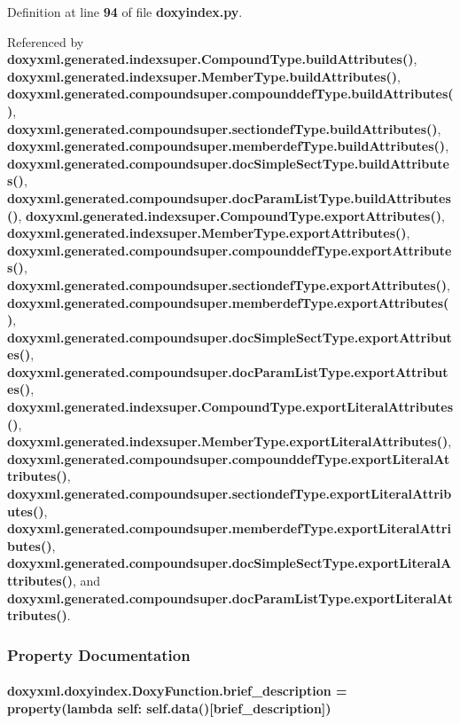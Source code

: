 Definition at line {\bf 94} of file {\bf doxyindex.\+py}.



Referenced by {\bf doxyxml.\+generated.\+indexsuper.\+Compound\+Type.\+build\+Attributes()}, {\bf doxyxml.\+generated.\+indexsuper.\+Member\+Type.\+build\+Attributes()}, {\bf doxyxml.\+generated.\+compoundsuper.\+compounddef\+Type.\+build\+Attributes()}, {\bf doxyxml.\+generated.\+compoundsuper.\+sectiondef\+Type.\+build\+Attributes()}, {\bf doxyxml.\+generated.\+compoundsuper.\+memberdef\+Type.\+build\+Attributes()}, {\bf doxyxml.\+generated.\+compoundsuper.\+doc\+Simple\+Sect\+Type.\+build\+Attributes()}, {\bf doxyxml.\+generated.\+compoundsuper.\+doc\+Param\+List\+Type.\+build\+Attributes()}, {\bf doxyxml.\+generated.\+indexsuper.\+Compound\+Type.\+export\+Attributes()}, {\bf doxyxml.\+generated.\+indexsuper.\+Member\+Type.\+export\+Attributes()}, {\bf doxyxml.\+generated.\+compoundsuper.\+compounddef\+Type.\+export\+Attributes()}, {\bf doxyxml.\+generated.\+compoundsuper.\+sectiondef\+Type.\+export\+Attributes()}, {\bf doxyxml.\+generated.\+compoundsuper.\+memberdef\+Type.\+export\+Attributes()}, {\bf doxyxml.\+generated.\+compoundsuper.\+doc\+Simple\+Sect\+Type.\+export\+Attributes()}, {\bf doxyxml.\+generated.\+compoundsuper.\+doc\+Param\+List\+Type.\+export\+Attributes()}, {\bf doxyxml.\+generated.\+indexsuper.\+Compound\+Type.\+export\+Literal\+Attributes()}, {\bf doxyxml.\+generated.\+indexsuper.\+Member\+Type.\+export\+Literal\+Attributes()}, {\bf doxyxml.\+generated.\+compoundsuper.\+compounddef\+Type.\+export\+Literal\+Attributes()}, {\bf doxyxml.\+generated.\+compoundsuper.\+sectiondef\+Type.\+export\+Literal\+Attributes()}, {\bf doxyxml.\+generated.\+compoundsuper.\+memberdef\+Type.\+export\+Literal\+Attributes()}, {\bf doxyxml.\+generated.\+compoundsuper.\+doc\+Simple\+Sect\+Type.\+export\+Literal\+Attributes()}, and {\bf doxyxml.\+generated.\+compoundsuper.\+doc\+Param\+List\+Type.\+export\+Literal\+Attributes()}.



\subsubsection{Property Documentation}
\paragraph[{brief\+\_\+description}]{\setlength{\rightskip}{0pt plus 5cm}doxyxml.\+doxyindex.\+Doxy\+Function.\+brief\+\_\+description = {\bf property}(lambda self\+: {\bf self.\+data}()[\textquotesingle{}brief\+\_\+description\textquotesingle{}])\hspace{0.3cm}{\ttfamily [static]}}\label{classdoxyxml_1_1doxyindex_1_1DoxyFunction_af625827dd104f46b3564204f1900bc6e}


